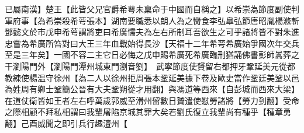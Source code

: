 已屬南漢】楚王【此皆父兄官爵希萼未稟命于中國而自稱之】以希崇為節度副使判軍府事【為希崇殺希萼張本】湖南要職悉以朗人為之臠食李弘臯弘節唐昭胤楊滌斬鄧懿文於市戊申希萼謂將吏曰希廣懦夫為左右所制耳吾欲生之可乎諸將皆不對朱進忠嘗為希廣所笞對曰大王三年血戰始得長沙【天福十二年希萼希廣始爭國次年交兵至是三年矣】一國不容二主它日必悔之戊申賜希廣死希廣臨刑猶誦佛書彭師暠葬之干瀏陽門外【瀏陽門潭州城東門瀏音劉】　武寧節度使贇留右都押牙鞏延美元從都教練使楊温守徐州【為二人以徐州拒周張本鞏延美據下卷及歐史當作鞏廷美鞏以邑為姓周有卿士鞏簡公晉有大夫鞏朔從才用翻】與馮道等西來【自彭城而西來大梁】在道仗衛皆如王者左右呼萬歲郭威至滑州留數日贇遣使慰勞諸將【勞力到翻】受命之際相顧不拜私相謂曰我輩屠陷京城其罪大矣若劉氏復立我輩尚有種乎【種章勇翻】己酉威聞之即引兵行趣澶州【